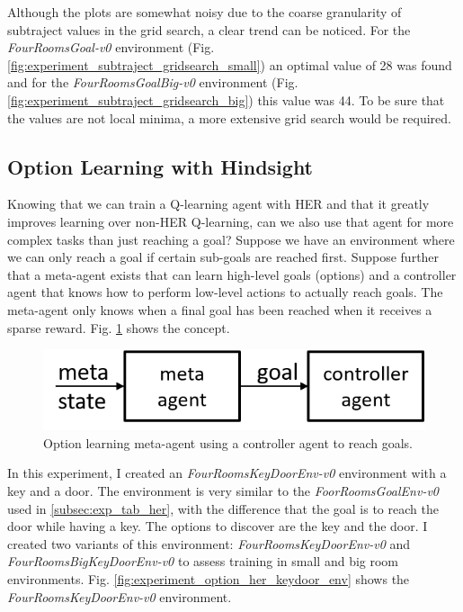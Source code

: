\documentclass[conference]{IEEEtran}
\begin{document}
Although the plots are somewhat noisy due to the coarse granularity of subtraject values in the grid search, a clear trend can be noticed. For the \textit{FourRoomsGoal-v0} environment (Fig. \ref{fig:experiment_subtraject_gridsearch_small}) an optimal value of 28 was found and for the \textit{FourRoomsGoalBig-v0} environment (Fig. \ref{fig:experiment_subtraject_gridsearch_big}) this value was 44. To be sure that the values are not local minima, a more extensive grid search would be required.

\subsection{Option Learning with Hindsight}
Knowing that we can train a Q-learning agent with HER and that it greatly improves learning over non-HER Q-learning, can we also use that agent for more complex tasks than just reaching a goal? Suppose we have an environment where we can only reach a goal if certain sub-goals are reached first. Suppose further that a meta-agent exists that can learn high-level goals (options) and a controller agent that knows how to perform low-level actions to actually reach goals. The meta-agent only knows when a final goal has been reached when it receives a sparse reward. Fig. \ref{fig:experiment_option_her_concept} shows the concept.

\begin{figure}[ht]
\centering
\includegraphics[width=0.9\columnwidth]{img/option_her_concept.png}
\caption{Option learning meta-agent using a controller agent to reach goals.}
\label{fig:experiment_option_her_concept}
\end{figure}

In this experiment, I created an \textit{FourRoomsKeyDoorEnv-v0} environment with a key and a door. The environment is very similar to the \textit{FoorRoomsGoalEnv-v0} used in \ref{subsec:exp_tab_her}, with the difference that the goal is to reach the door while having a key. The options to discover are the key and the door. I created two variants of this environment: \textit{FourRoomsKeyDoorEnv-v0} and \textit{FourRoomsBigKeyDoorEnv-v0} to assess training in small and big room environments. Fig. \ref{fig:experiment_option_her_keydoor_env} shows the \textit{FourRoomsKeyDoorEnv-v0} environment.
\end{document}
